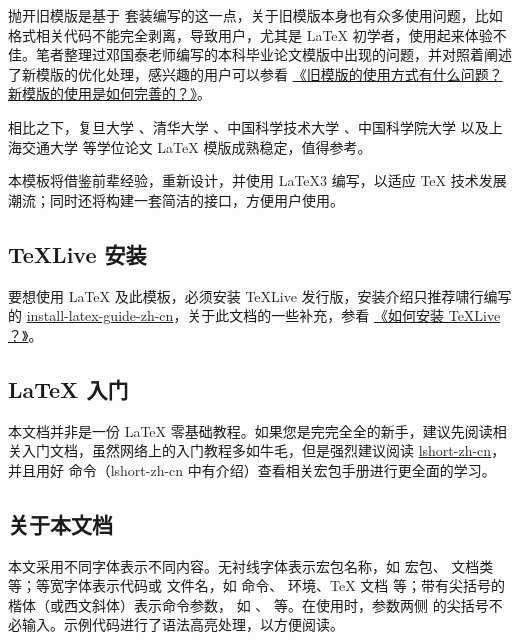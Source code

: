\documentclass{ccnudoc}
\begin{document}
抛开旧模版是基于 \CTeX 套装编写的这一点，关于旧模版本身也有众多使用问题，比如格式相关代码不能完全剥离，导致用户，尤其是 \LaTeX{} 初学者，使用起来体验不佳。笔者整理过邓国泰老师编写的本科毕业论文模版中出现的问题，并对照着阐述了新模版的优化处理，感兴趣的用户可以参看 \href{https://gitee.com/xkwxdyy/CCNUthesis/wikis/%E5%B8%B8%E8%A7%81%E9%97%AE%E9%A2%98FAQ/%E6%97%A7%E6%A8%A1%E7%89%88%E7%9A%84%E4%BD%BF%E7%94%A8%E6%96%B9%E5%BC%8F%E6%9C%89%E4%BB%80%E4%B9%88%E9%97%AE%E9%A2%98%EF%BC%9F%E6%96%B0%E6%A8%A1%E7%89%88%E7%9A%84%E4%BD%BF%E7%94%A8%E6%98%AF%E5%A6%82%E4%BD%95%E5%AE%8C%E5%96%84%E7%9A%84%EF%BC%9F}{《旧模版的使用方式有什么问题？新模版的使用是如何完善的？》}。

相比之下，复旦大学 、清华大学 、中国科学技术大学 、中国科学院大学  以及上海交通大学  等学位论文 \LaTeX{} 模版成熟稳定，值得参考。

本模板将借鉴前辈经验，重新设计，并使用 \LaTeX3 编写，以适应 \TeX{} 技术发展潮流；同时还将构建一套简洁的接口，方便用户使用。


\subsection*{TeXLive 安装}

要想使用 \LaTeX{} 及此模板，必须安装 \TeX Live 发行版，安装介绍只推荐啸行编写的 \href{https://ctan.math.illinois.edu/info/install-latex-guide-zh-cn/install-latex-guide-zh-cn.pdf}{install-latex-guide-zh-cn}，关于此文档的一些补充，参看 \href{https://gitee.com/xkwxdyy/CCNUthesis/wikis/%E5%B8%B8%E8%A7%81%E9%97%AE%E9%A2%98FAQ/%E5%A6%82%E4%BD%95%E5%AE%89%E8%A3%85TeXLive}{《如何安装 TeXLive ？》}。


\subsection*{\LaTeX{} 入门}

本文档并非是一份 \LaTeX{} 零基础教程。如果您是完完全全的新手，建议先阅读相关入门文档，虽然网络上的入门教程多如牛毛，但是强烈建议阅读 \href{https://ctan.math.illinois.edu/info/lshort/chinese/lshort-zh-cn.pdf}{lshort-zh-cn}，并且用好  命令（lshort-zh-cn 中有介绍）查看相关宏包手册进行更全面的学习。


\subsection*{关于本文档}

本文采用不同字体表示不同内容。无衬线字体表示宏包名称，如
 宏包、 文档类等；等宽字体表示代码或
文件名，如  命令、 环境、\TeX{} 文档
 等；带有尖括号的楷体（或西文斜体）表示命令参数，
如 、 等。在使用时，参数两侧
的尖括号不必输入。示例代码进行了语法高亮处理，以方便阅读。
\end{document}
